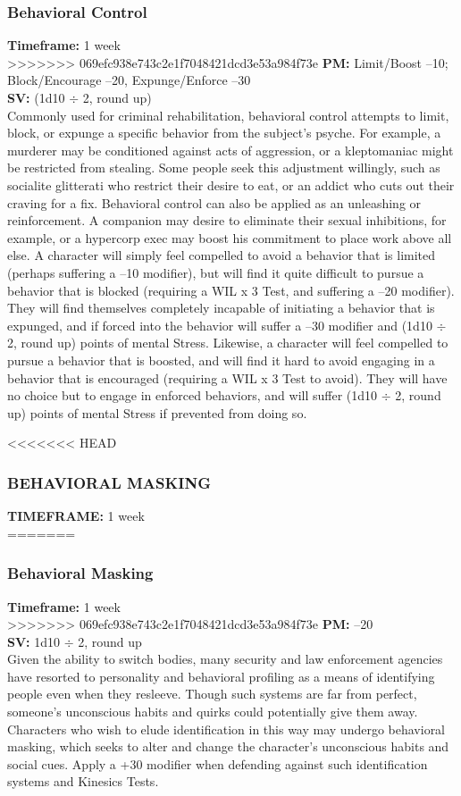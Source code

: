\subsubsection{Behavioral Control}
\textbf{Timeframe:} 1 week \\
>>>>>>> 069efc938e743c2e1f7048421dcd3e53a984f73e
\textbf{PM:} Limit/Boost –10; Block/Encourage –20, Expunge/Enforce –30 \\
\textbf{SV:} (1d10 $\div$ 2, round up) \\
Commonly used for criminal rehabilitation, behavioral
control attempts to limit, block, or expunge a
specific behavior from the subject’s psyche. For example,
a murderer may be conditioned against acts of aggression,
or a kleptomaniac might be restricted from
stealing. Some people seek this adjustment willingly,
such as socialite glitterati who restrict their desire to
eat, or an addict who cuts out their craving for a fix.
Behavioral control can also be applied as an unleashing
or reinforcement. A companion may desire
to eliminate their sexual inhibitions, for example, or
a hypercorp exec may boost his commitment to place
work above all else.
A character will simply feel compelled to avoid
a behavior that is limited (perhaps suffering a –10
modifier), but will find it quite difficult to pursue a behavior
that is blocked (requiring a WIL x 3 Test, and
suffering a –20 modifier). They will find themselves
completely incapable of initiating a behavior that is
expunged, and if forced into the behavior will suffer
a –30 modifier and (1d10 $\div$ 2, round up) points of
mental Stress.
Likewise, a character will feel compelled to pursue a
behavior that is boosted, and will find it hard to avoid
engaging in a behavior that is encouraged (requiring a
WIL x 3 Test to avoid). They will have no choice but
to engage in enforced behaviors, and will suffer (1d10
$\div$ 2, round up) points of mental Stress if prevented
from doing so.

<<<<<<< HEAD
\subsubsection{BEHAVIORAL MASKING}
\textbf{TIMEFRAME:} 1 week \\
=======
\subsubsection{Behavioral Masking}
\textbf{Timeframe:} 1 week \\
>>>>>>> 069efc938e743c2e1f7048421dcd3e53a984f73e
\textbf{PM:} –20 \\
\textbf{SV:} 1d10 $\div$ 2, round up \\
Given the ability to switch bodies, many security and
law enforcement agencies have resorted to personality
and behavioral profiling as a means of identifying
people even when they resleeve. Though such systems
are far from perfect, someone’s unconscious habits
and quirks could potentially give them away. Characters
who wish to elude identification in this way may
undergo behavioral masking, which seeks to alter and
change the character’s unconscious habits and social
cues. Apply a +30 modifier when defending against
such identification systems and Kinesics Tests.

